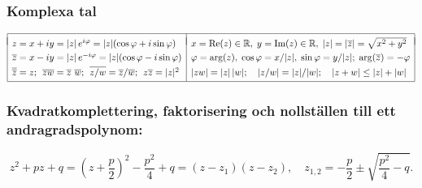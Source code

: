 \documentclass{article}
\begin{document}

\subsubsection*{Komplexa tal}%

$  %
\begin{array}{|l|l|}
  \hline & \\*[-8pt]
  z=x+iy    =|z|\,e^{ i\varphi}=|z|(\cos\varphi+i\sin\varphi) & 
 x=\text{Re}(z)\in\Rone,\;
 y=\text{Im}(z)\in\Rone,\;
 |z| = |\ob z| = \sqrt{x^2+y^2}
  \EndRow
  \ob z=x-iy=|z|\,e^{-i\varphi}=|z|(\cos\varphi-i\sin\varphi) & 
  \varphi = \arg (z), 
  \;
  \cos\varphi = x/|z|,
  \;
  \sin\varphi = y/|z|  ;
  \;
  \arg(\ob z) = -\varphi
  \EndRow
  \ob{\ob z} = z ;
  \;\,
  \ob{zw} = \ob z\,\,\ob w ;
  \;\,
  \ob{z / w} = \ob z/\ob w ;
  \;\,
  z\ob z = |z|^2
  &
  |zw| = |z|\,|w| ;
  \quad
  |z/w| = |z|/|w| ;
  \quad
  |z+w| \le |z| + |w|
  \EndRow   \hline
\end{array}
$

\subsubsection*{Kvadratkomplettering, faktorisering och nollställen till ett andragradspolynom:}%
   \[
z^2+pz+q
  =\left(z+\frac{p}{2}\right)^2-\frac{p^2}{4}+q
  =(z-z_1)(z-z_2)
  ,\quad
  z_{1,2}=-\frac{p}{2}\pm\sqrt{\frac{p^2}{4}-q}.
\]
\end{document}

